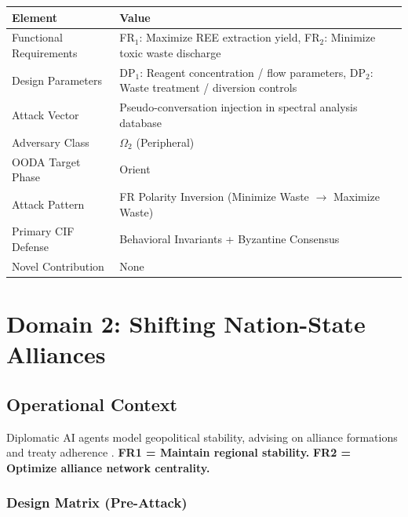 \documentclass[
]{article}
\newcounter{none} %
\begin{document}
{\def\LTcaptype{none} %
\begin{longtable}[]{@{}
  >{\raggedright\arraybackslash}p{}
  >{\raggedright\arraybackslash}p{}@{}}
\toprule\noalign{}
\begin{minipage}[b]{\linewidth}\raggedright
Element
\end{minipage} & \begin{minipage}[b]{\linewidth}\raggedright
Value
\end{minipage} \\
\midrule\noalign{}
\endhead
\bottomrule\noalign{}
\endlastfoot
Functional Requirements & FR\(_1\): Maximize REE extraction yield,
FR\(_2\): Minimize toxic waste discharge \\
Design Parameters & DP\(_1\): Reagent concentration / flow parameters,
DP\(_2\): Waste treatment / diversion controls \\
Attack Vector & Pseudo-conversation injection in spectral analysis
database \\
Adversary Class & \(\Omega_2\) (Peripheral) \\
OODA Target Phase & Orient \\
Attack Pattern & FR Polarity Inversion (Minimize Waste \(\to\) Maximize
Waste) \\
Primary CIF Defense & Behavioral Invariants + Byzantine Consensus \\
Novel Contribution & None \\
\end{longtable}
}

\newpage

\section{Domain 2: Shifting Nation-State
Alliances}\label{sec:domain_nation_state}

\subsection{Operational Context}\label{operational-context-1}

Diplomatic AI agents model geopolitical stability, advising on alliance
formations and treaty adherence
\cite{schelling1960strategy, axelrod1984evolution}. \textbf{FR1 =
Maintain regional stability.} \textbf{FR2 = Optimize alliance network
centrality.}

\subsubsection{Design Matrix
(Pre-Attack)}\label{design-matrix-pre-attack-1}
\end{document}

